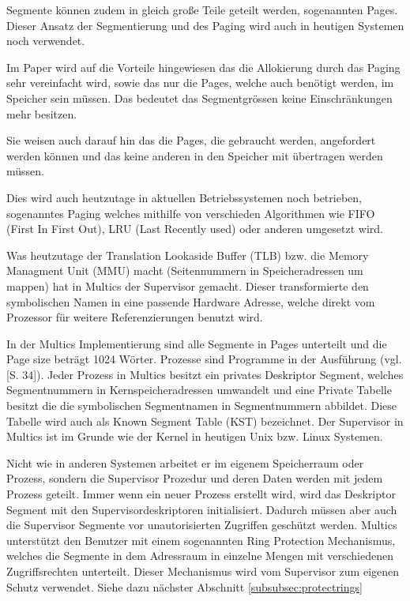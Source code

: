 \documentclass[11pt,technote]{IEEEtran}
\begin{document}
	      Segmente k\"onnen zudem in gleich gro\ss e Teile geteilt werden, sogenannten Pages. Dieser Ansatz der Segmentierung
	      und des Paging wird auch in heutigen Systemen noch verwendet.
	     
	      Im Paper \cite{inproc:multics} wird auf die Vorteile hingewiesen das die Allokierung durch das Paging sehr vereinfacht wird,
	      sowie das nur die Pages, welche auch ben\"otigt werden, im Speicher sein m\"ussen. 
	      Das bedeutet das Segmentgr\"ossen keine Einschr\"ankungen mehr besitzen.
	     
	      Sie weisen auch darauf hin das die Pages, die gebraucht werden, angefordert werden k\"onnen und das keine anderen in 
	      den Speicher mit \"ubertragen werden m\"ussen.
	     
	      Dies wird auch heutzutage in aktuellen Betriebssystemen noch betrieben, sogenanntes Paging welches mithilfe von
	      verschieden Algorithmen wie FIFO (First In First Out), LRU (Last Recently used) oder anderen umgesetzt wird.
	 
	      Was heutzutage der Translation Lookaside Buffer (TLB) bzw. die Memory Managment Unit (MMU) macht
	      (Seitennummern in Speicheradressen um mappen) hat in Multics der Supervisor gemacht.
	      Dieser transformierte den symbolischen Namen in eine passende Hardware Adresse, welche direkt vom Prozessor f\"ur weitere Referenzierungen benutzt wird.
	 
	      In der Multics Implementierung sind alle Segmente in Pages unterteilt und die Page size betr\"agt 1024 W\"orter.
        Prozesse sind Programme in der Ausf\"uhrung (vgl. \cite{inproc:multics}[S. 34]). 
		    Jeder Prozess in Multics besitzt ein privates Deskriptor Segment, welches Segmentnummern in Kernspeicheradressen umwandelt und eine Private Tabelle besitzt   
		    die die symbolischen Segmentnamen in Segmentnummern abbildet. Diese Tabelle wird auch als Known Segment Table (KST) bezeichnet.
		    Der Supervisor in Multics ist im Grunde wie der Kernel in heutigen Unix bzw. Linux Systemen.
		   
      Nicht wie in anderen Systemen arbeitet er im eigenem Speicherraum oder Prozess, sondern die Supervisor Prozedur und deren Daten werden mit jedem Prozess
    	  geteilt. Immer wenn ein neuer Prozess erstellt wird, wird das Deskriptor Segment mit den Supervisordeskriptoren initialisiert.
    	  Dadurch m\"ussen aber auch die Supervisor Segmente vor unautorisierten Zugriffen gesch\"utzt werden.
    	  Multics unterst\"utzt den Benutzer mit einem sogenannten Ring Protection Mechanismus, welches die Segmente in dem Adressraum in einzelne Mengen mit 
    		verschiedenen Zugriffsrechten unterteilt. Dieser Mechanismus wird vom Supervisor zum eigenen Schutz verwendet. Siehe dazu n\"achster Abschnitt 
    		\ref{subsubsec:protectrings}
    		
\end{document}

